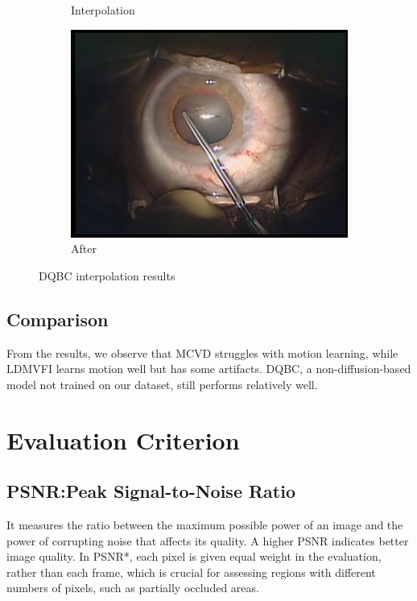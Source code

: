 \documentclass[lettersize,journal]{IEEEtran}
\begin{document}
\begin{figure}[h!]
\begin{subfigure}[b]{0.3\textwidth}
        \caption{Interpolation}
        \label{fig:dqbc2}
    \end{subfigure}
    \hfill 
    \begin{subfigure}[b]{0.3\textwidth}
        \includegraphics[width=\textwidth]{Image/DQBC result3.jpg}
        \caption{After}
        \label{fig:dqbc3}
    \end{subfigure}
    \caption{DQBC interpolation results}
    \label{fig:dqbc_results}
\end{figure}

\subsection{Comparison}
From the results, we observe that MCVD struggles with motion learning, while LDMVFI learns motion well but has some artifacts. DQBC, a non-diffusion-based model not trained on our dataset, still performs relatively well.

\section{Evaluation Criterion}

\subsection{PSNR:Peak Signal-to-Noise Ratio}
It measures the ratio between the maximum possible power of an image and the power of corrupting noise that affects its quality. A higher PSNR indicates better image quality. In PSNR*, each pixel is given equal weight in the evaluation, rather than each frame, which is crucial for assessing regions with different numbers of pixels, such as partially occluded areas.
\end{document}

